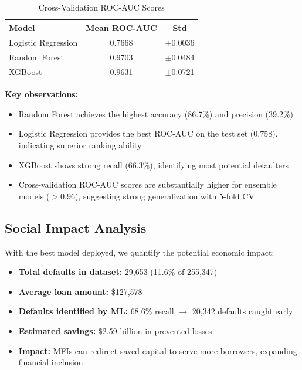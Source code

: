 \documentclass[runningheads]{llncs}
\begin{document}

\begin{table}[H]
\centering
\caption{Cross-Validation ROC-AUC Scores}
\label{tab:cv_results}
\begin{tabular}{@{}lcc@{}}
\toprule
Model & Mean ROC-AUC & Std \\
\midrule
Logistic Regression & 0.7668 & $\pm$0.0036 \\
Random Forest & 0.9703 & $\pm$0.0484 \\
XGBoost & 0.9631 & $\pm$0.0721 \\
\bottomrule
\end{tabular}
\end{table}

\textbf{Key observations:}
\begin{itemize}
    \item Random Forest achieves the highest accuracy (86.7\%) and precision (39.2\%)
    \item Logistic Regression provides the best ROC-AUC on the test set (0.758), indicating superior ranking ability
    \item XGBoost shows strong recall (66.3\%), identifying most potential defaulters
    \item Cross-validation ROC-AUC scores are substantially higher for ensemble models ($>$0.96), suggesting strong generalization with 5-fold CV
\end{itemize}


\subsection{Social Impact Analysis}

With the best model deployed, we quantify the potential economic impact:

\begin{itemize}
    \item \textbf{Total defaults in dataset:} 29,653 (11.6\% of 255,347)
    \item \textbf{Average loan amount:} \$127,578
    \item \textbf{Defaults identified by ML:} 68.6\% recall $\rightarrow$ 20,342 defaults caught early
    \item \textbf{Estimated savings:} \$2.59 billion in prevented losses
    \item \textbf{Impact:} MFIs can redirect saved capital to serve more borrowers, expanding financial inclusion
\end{itemize}
\end{document}
